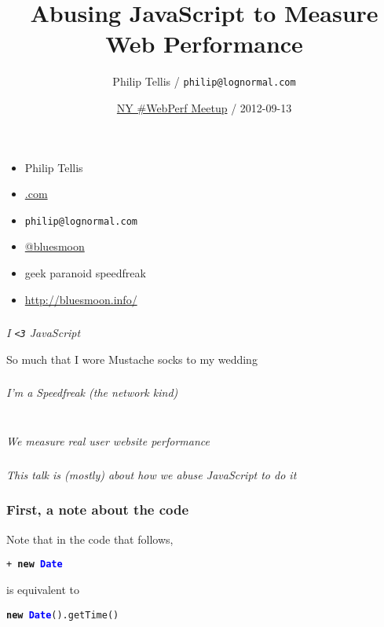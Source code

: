 \documentclass{beamer}
\author{Philip Tellis / \texttt{philip@lognormal.com}}
\title{Abusing JavaScript to Measure Web Performance}
\date{\href{http://www.nywebperformance.org/events/78566362/}{NY \#WebPerf Meetup} / 2012-09-13}
\newcommand{\innersplash}[1]{
  \begin{center}
    \large \textrm{\textit{ #1 } }
  \end{center}
}
\newcommand{\splashslide}[2][{}]{
  \begin{frame}
  \frametitle{#1}
  \innersplash{#2}
  \end{frame}
}
\def\green<#1>#2{\textcolor<#1>{dark-green}{\textbf<#1>{#2}}}
\def\blue<#1>#2{\textcolor<#1>{blue}{\textbf<#1>{#2}}}
\begin{document}
\begin{frame}
  \begin{itemize}
  \item Philip Tellis
  \item \href{http://www.lognormal.com/}{\textrm{\textcolor{med-gray}{.com}}}
  \item \small{\texttt{philip@lognormal.com}}
  \item \href{http://twitter.com/bluesmoon}{@bluesmoon}
  \item geek paranoid speedfreak
  \item \href{http://bluesmoon.info/}{http://bluesmoon.info/}
  \end{itemize}
\end{frame}

\splashslide{I \texttt{<3} JavaScript}

\begin{frame}{So much that I wore Mustache socks to my wedding}
\end{frame}

\splashslide{I'm a Speedfreak (the network kind)}

\splashslide{ \\ We measure real user website performance}

\splashslide{This talk is (mostly) about how we abuse JavaScript to do it}

\begin{frame}
  \titlepage
\end{frame}

\begin{frame}[fragile]
\frametitle{First, a note about the code}
\begin{center}
Note that in the code that follows,

\vspace{1.5em}
\texttt{+ \green<1>{new} \blue<1>{Date}}

\vspace{1.5em}
is equivalent to

\vspace{1.5em}
\texttt{\green<1>{new} \blue<1>{Date}().getTime()}
\end{center}
\end{frame}
\end{document}

